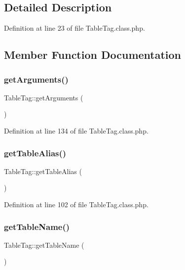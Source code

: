 \subsection{Detailed Description}


Definition at line 23 of file Table\+Tag.\+class.\+php.



\subsection{Member Function Documentation}
\hypertarget{classTableTag_a39fa54b8c8be305fec72ce6b7e9920a3}{}\label{classTableTag_a39fa54b8c8be305fec72ce6b7e9920a3} 
\subsubsection{\texorpdfstring{get\+Arguments()}{getArguments()}}
{\footnotesize\ttfamily Table\+Tag\+::get\+Arguments (\begin{DoxyParamCaption}{ }\end{DoxyParamCaption})}



Definition at line 134 of file Table\+Tag.\+class.\+php.

\hypertarget{classTableTag_a52a3da2a0eee31ce88e44e38e71dfa9a}{}\label{classTableTag_a52a3da2a0eee31ce88e44e38e71dfa9a} 
\subsubsection{\texorpdfstring{get\+Table\+Alias()}{getTableAlias()}}
{\footnotesize\ttfamily Table\+Tag\+::get\+Table\+Alias (\begin{DoxyParamCaption}{ }\end{DoxyParamCaption})}



Definition at line 102 of file Table\+Tag.\+class.\+php.

\hypertarget{classTableTag_aca16238dff09141c6de5590416c872fb}{}\label{classTableTag_aca16238dff09141c6de5590416c872fb} 
\subsubsection{\texorpdfstring{get\+Table\+Name()}{getTableName()}}
{\footnotesize\ttfamily Table\+Tag\+::get\+Table\+Name (\begin{DoxyParamCaption}{ }\end{DoxyParamCaption})}



